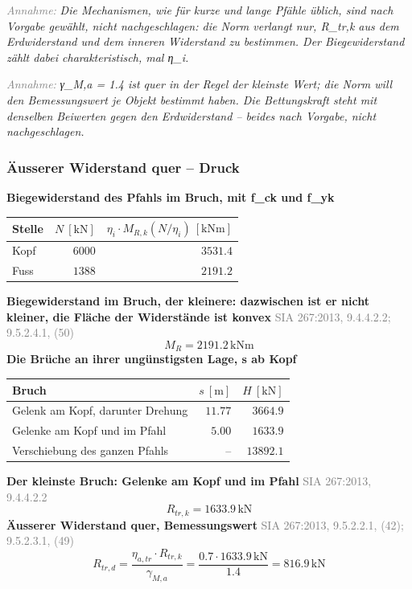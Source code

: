 \documentclass[11pt,a4paper]{article}
\newcommand{\normref}[1]{{\small\textcolor{gray}{#1}}}
\newcommand{\hinweis}[2]{\par\noindent\textcolor{gray}{\textit{#1:}} \textit{#2}\par}
\begin{document}
\hinweis{Annahme}{Die Mechanismen, wie für kurze und lange Pfähle üblich, sind nach Vorgabe gewählt, nicht nachgeschlagen: die Norm verlangt nur, R\_tr,k aus dem Erdwiderstand und dem inneren Widerstand zu bestimmen. Der Biegewiderstand zählt dabei charakteristisch, mal η\_i.}
\hinweis{Annahme}{γ\_M,a = 1.4 ist quer in der Regel der kleinste Wert; die Norm will den Bemessungswert je Objekt bestimmt haben. Die Bettungskraft steht mit denselben Beiwerten gegen den Erdwiderstand -- beides nach Vorgabe, nicht nachgeschlagen.}
\subsubsection{Äusserer Widerstand quer – Druck}
\noindent\textbf{Biegewiderstand des Pfahls im Bruch, mit f\_ck und f\_yk}
\begin{longtable}{lrr}
\hline
Stelle & $N\ [\mathrm{kN}]$ & $\eta_i \cdot M_{R,k}(N / \eta_i)\ [\mathrm{kNm}]$ \\
\hline
\endhead
Kopf & $6000$ & $3531.4$ \\
Fuss & $1388$ & $2191.2$ \\
\hline
\end{longtable}
\noindent\textbf{Biegewiderstand im Bruch, der kleinere: dazwischen ist er nicht kleiner, die Fläche der Widerstände ist konvex} \hfill \normref{SIA 267:2013, 9.4.4.2.2; 9.5.2.4.1, (50)}
\begin{equation*}
M_R = 2191.2\,\mathrm{kNm}
\end{equation*}
\noindent\textbf{Die Brüche an ihrer ungünstigsten Lage, s ab Kopf}
\begin{longtable}{lrr}
\hline
Bruch & $s\ [\mathrm{m}]$ & $H\ [\mathrm{kN}]$ \\
\hline
\endhead
Gelenk am Kopf, darunter Drehung & $11.77$ & $3664.9$ \\
Gelenke am Kopf und im Pfahl & $5.00$ & $1633.9$ \\
Verschiebung des ganzen Pfahls & – & $13892.1$ \\
\hline
\end{longtable}
\noindent\textbf{Der kleinste Bruch: Gelenke am Kopf und im Pfahl} \hfill \normref{SIA 267:2013, 9.4.4.2.2}
\begin{equation*}
R_{tr,k} = 1633.9\,\mathrm{kN}
\end{equation*}
\noindent\textbf{Äusserer Widerstand quer, Bemessungswert} \hfill \normref{SIA 267:2013, 9.5.2.2.1, (42); 9.5.2.3.1, (49)}
\begin{equation*}
R_{tr,d} = \frac{\eta_{a,tr} \cdot R_{tr,k}}{\gamma_{M,a}} = \frac{0.7 \cdot 1633.9\,\mathrm{kN}}{1.4} = 816.9\,\mathrm{kN}
\end{equation*}
\end{document}
